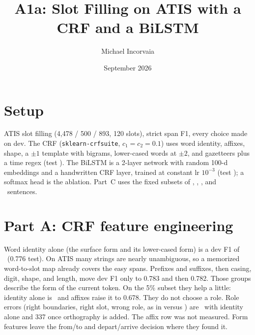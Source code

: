 \documentclass[10pt,twocolumn]{article}
\title{\vspace{-3em}A1a: Slot Filling on ATIS with a CRF and a BiLSTM}
\author{Michael Incorvaia} %
\date{September 2026}
\newif\ifshowtodos \showtodosfalse %
\newcommand{\todo}[1]{\ifshowtodos{\color{red!70!black}\textbf{[TODO:} #1\textbf{]}}\fi}
\newcommand{\slot}[1]{\texttt{\detokenize{#1}}}
\begin{document}
\maketitle
\vspace{-1.5em}

\section{Setup}
ATIS slot filling (4,478 / 500 / 893, 120 slots), strict span F1, every choice made on dev.
The CRF (\texttt{sklearn-crfsuite}, $c_1{=}c_2{=}0.1$) uses word identity, affixes, shape,
a $\pm1$ template with bigrams, lower-cased words at $\pm2$, and gazetteers plus a time regex
(test \crfTestFull).
The BiLSTM is a 2-layer network with random 100-d embeddings and a handwritten CRF layer,
trained at constant lr $10^{-3}$ (test \lstmTestFull); a softmax head is the ablation.
Part~C uses the fixed subsets of \nSentFive, \nSentTen, \nSentTwentyFive, and \nSentFull\ sentences.

\todo{Optional 1--2 sentences: anything else about your design choices.}

\section{Part A: CRF feature engineering}
\begin{table}[t]
\centering\small
\caption{CRF feature log (last column: same features trained on the 5\% subset). Top block adds feature groups
cumulatively; bottom block removes one group from the full set.}
\label{tab:ablation}

\end{table}

\todo{Interpret the feature log. Which groups matter and why, in terms of what
information each one gives the model? Facts to work from: identity only
\crfDevIdentity; adding $\pm1$ context gives \crfDevCtxOne; removing all context
drops the full model from \crfDevFull\ to \crfDevNoCtx; removing gazetteers gives
\crfDevNoGaz. Note every gazetteer entry also appears in the training data.}

Word identity alone (the surface form and its lower-cased form) is a dev F1 of
\crfDevIdentity\ (0.776 test). On ATIS many strings are nearly unambiguous, so a
memorized word-to-slot map already covers the easy spans. Prefixes and suffixes,
then casing, digit, shape, and length, move dev F1 only to 0.783 and then 0.782.
Those groups describe the form of the current token. On the 5\% subset they help
a little: identity alone is \crfDevFiveIdentity\ and affixes raise it to 0.678.
They do not choose a role. Role errors (right boundaries, right slot, wrong role,
as in \slot{toloc.city_name} versus \slot{fromloc.city_name}) are
\crfRoleIdentity\ with identity alone and 337 once orthography is added. The
affix row was not measured. Form features leave the from/to and depart/arrive
decision where they found it.
\end{document}
